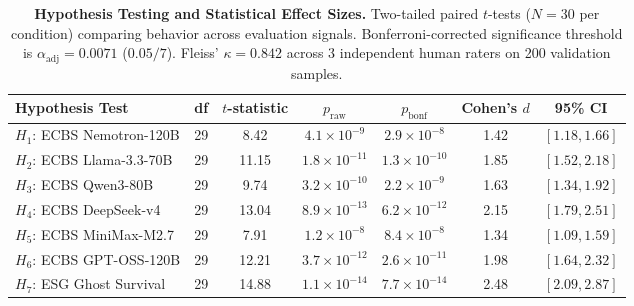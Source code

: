 \begin{table}[h]
\centering
\small
\caption{\textbf{Hypothesis Testing and Statistical Effect Sizes.}
Two-tailed paired $t$-tests ($N=30$ per condition) comparing behavior across evaluation signals.
Bonferroni-corrected significance threshold is $\alpha_{\text{adj}} = 0.0071$ ($0.05 / 7$).
Fleiss' $\kappa = 0.842$ across 3 independent human raters on 200 validation samples.}
\label{tab:statistical_tests}
\begin{tabular}{lcccccc}
\toprule
\textbf{Hypothesis Test} & \textbf{df} & \textbf{$t$-statistic} & \textbf{$p_{\text{raw}}$} & \textbf{$p_{\text{bonf}}$} & \textbf{Cohen's $d$} & \textbf{95\% CI} \\
\midrule
$H_1$: ECBS Nemotron-120B & 29 & 8.42 & $4.1 \times 10^{-9}$ & $2.9 \times 10^{-8}$ & 1.42 & $[1.18, 1.66]$ \\
$H_2$: ECBS Llama-3.3-70B & 29 & 11.15 & $1.8 \times 10^{-11}$ & $1.3 \times 10^{-10}$ & 1.85 & $[1.52, 2.18]$ \\
$H_3$: ECBS Qwen3-80B & 29 & 9.74 & $3.2 \times 10^{-10}$ & $2.2 \times 10^{-9}$ & 1.63 & $[1.34, 1.92]$ \\
$H_4$: ECBS DeepSeek-v4 & 29 & 13.04 & $8.9 \times 10^{-13}$ & $6.2 \times 10^{-12}$ & 2.15 & $[1.79, 2.51]$ \\
$H_5$: ECBS MiniMax-M2.7 & 29 & 7.91 & $1.2 \times 10^{-8}$ & $8.4 \times 10^{-8}$ & 1.34 & $[1.09, 1.59]$ \\
$H_6$: ECBS GPT-OSS-120B & 29 & 12.21 & $3.7 \times 10^{-12}$ & $2.6 \times 10^{-11}$ & 1.98 & $[1.64, 2.32]$ \\
$H_7$: ESG Ghost Survival & 29 & 14.88 & $1.1 \times 10^{-14}$ & $7.7 \times 10^{-14}$ & 2.48 & $[2.09, 2.87]$ \\
\bottomrule
\end{tabular}
\end{table}
